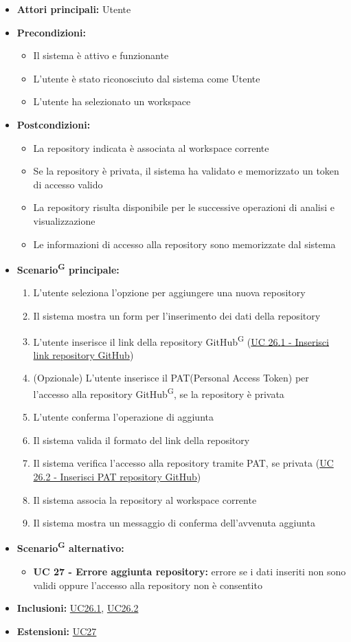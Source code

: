 \documentclass[a4paper, 11pt]{article}
\begin{document}
\begin{itemize}
	\item \textbf{Attori principali:} Utente
	\item \textbf{Precondizioni:} 
	\begin{itemize}
		\item Il sistema è attivo e funzionante
		\item L'utente è stato riconosciuto dal sistema come Utente
		\item L'utente ha selezionato un workspace
	\end{itemize}
	\item \textbf{Postcondizioni:} 
	\begin{itemize}
		\item La repository indicata è associata al workspace corrente
		\item Se la repository è privata, il sistema ha validato e memorizzato un token di accesso valido
		\item La repository risulta disponibile per le successive operazioni di analisi e visualizzazione
		\item Le informazioni di accesso alla repository sono memorizzate dal sistema
	\end{itemize}
	\item \textbf{Scenario\textsuperscript{G} principale:}
	\begin{enumerate}
		\item L'utente seleziona l'opzione per aggiungere una nuova repository
		\item Il sistema mostra un form per l'inserimento dei dati della repository
		\item L'utente inserisce il link della repository GitHub\textsuperscript{G} (\hyperref[UC26.1]{UC 26.1 - Inserisci link repository GitHub})
		\item (Opzionale) L'utente inserisce il PAT(Personal Access Token) per l'accesso alla repository GitHub\textsuperscript{G}, se la repository è privata
		\item L'utente conferma l'operazione di aggiunta
		\item Il sistema valida il formato del link della repository
		\item Il sistema verifica l'accesso alla repository tramite PAT, se privata (\hyperref[UC26.2]{UC 26.2 - Inserisci PAT repository GitHub})
		\item Il sistema associa la repository al workspace corrente
		\item Il sistema mostra un messaggio di conferma dell'avvenuta aggiunta
	\end{enumerate}
	\item \textbf{Scenario\textsuperscript{G} alternativo:}
	\begin{itemize}
		\item \textbf{UC 27 - Errore aggiunta repository:} errore se i dati inseriti non sono validi oppure l'accesso alla repository non è consentito 
	\end{itemize}
	\item \textbf{Inclusioni:} \hyperref[UC26.1]{UC26.1}, \hyperref[UC26.2]{UC26.2}
	\item \textbf{Estensioni:} \hyperref[UC27]{UC27}
\end{itemize}
\end{document}
